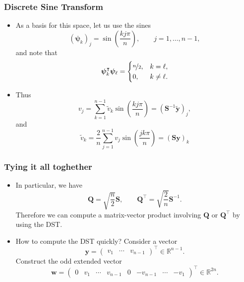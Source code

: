 \begin{frame}
  \frametitle{Discrete Sine Transform}
  \begin{itemize}
  \item As a basis for this space, let us use the sines
    \[
      (\bm \psi_k)_j = \sin\left( \frac{kj\pi}{n} \right),
      \qquad j = 1,\ldots,n-1,
    \]
    and note that
    \[
      \bm \psi_k^\intercal \bm \psi_\ell =
      \begin{cases}
        \nicefrac{n}{2}, & k = \ell, \\
        0, & k \not= \ell.
      \end{cases}
    \]
  \item Thus
    \[
      v_j = \sum_{k=1}^{n-1} \tilde{v}_k \sin \left( \frac{kj\pi}{n} \right)
      = \left( \bm S^{-1} \tilde{\bm y} \right)_j,
    \]
    and
    \[
      \tilde{v}_k = \frac{2}{n} \sum_{j=1}^{n-1} v_j \sin \left( \frac{jk\pi}{n} \right)
      = \left( \bm S \bm y \right)_k
    \]
  \end{itemize}
\end{frame}

\begin{frame}
  \frametitle{Tying it all toghether}
  \begin{itemize}
  \item In particular, we have
    \[
      \bm Q = \sqrt{\frac{n}{2}} \bm S, \qquad
      \bm Q^\intercal = \sqrt{\frac{2}{n}} \bm S^{-1}.
    \]
    Therefore we can compute a matrix-vector product involving $\bm Q$ or
    $\bm Q^\intercal$ by using the DST.
  \item How to compute the DST quickly? Consider a vector
    \[
      \bm y = \begin{pmatrix} v_1 & \cdots & v_{n-1} \end{pmatrix}^\intercal
      \in \mathbb{R}^{n-1}.
    \]
    Construct the odd extended vector
    \[
      \bm w =
      \begin{pmatrix}
        0 & v_1 & \cdots & v_{n-1} & 0 & -v_{n-1} & \cdots & -v_1
      \end{pmatrix}^\intercal
      \in \mathbb{R}^{2n}.
    \]
  \end{itemize}
\end{frame}

